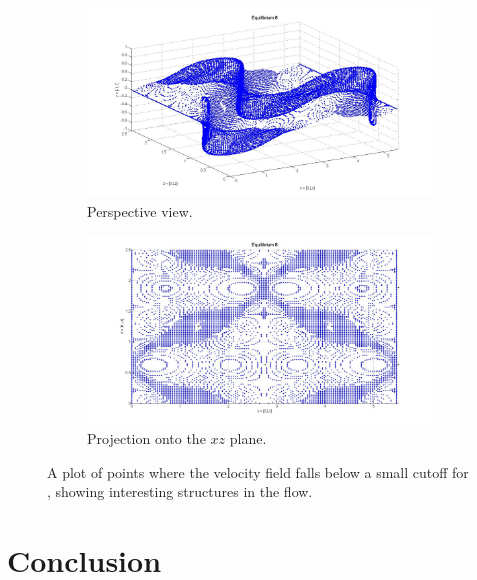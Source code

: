 \documentclass[lineno]{jfm}
\begin{document}
\begin{figure}[!h]
\centering
    \begin{subfigure}{0.9\textwidth}
    \includegraphics[width=1.0\textwidth]{usquare_EQ8_cute1.jpg}
      \caption{
        Perspective view.
       }
      \label{fig:usquare_EQ8_1}
    \end{subfigure}

    \begin{subfigure}{0.9\textwidth}
    \includegraphics[width=1.0\textwidth]{usquare_EQ8_cute2.jpg}
      \caption{
       Projection onto the $xz$
       plane.
       }
      \label{fig:usquare_EQ8_2}
    \end{subfigure}  
    \caption{
A plot of points where the velocity field falls below a small cutoff for 
{\tEQeight}, showing interesting structures in the flow. 
       }
    \label{fig:usquare_both}
 \end{figure}


\section{Conclusion}
\label{s:conclusion}
\end{document}
